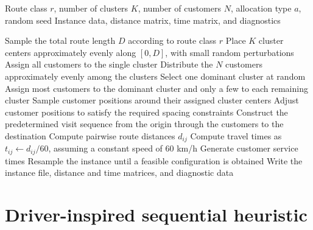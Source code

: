 \documentclass[3p,11pt,authoryear]{elsarticle}  %
\begin{document}
    
\begin{algorithm}[t]
\caption{Benchmark instance generation}
\label{alg:instance-generator}
\begin{algorithmic}[1]
\color{red}
\Require Route class $r$, number of clusters $K$, number of customers $N$,
         allocation type $a$, random seed
\Ensure Instance data, distance matrix, time matrix, and diagnostics

\State Sample the total route length $D$ according to route class $r$
\State Place $K$ cluster centers approximately evenly along $[0,D]$,
       with small random perturbations
    \State Assign all customers to the single cluster
    \State Distribute the $N$ customers approximately evenly among the clusters
\Else
    \State Select one dominant cluster at random
    \State Assign most customers to the dominant cluster and only a few to each remaining cluster
\EndIf
\State Sample customer positions around their assigned cluster centers
\State Adjust customer positions to satisfy the required spacing constraints
\State Construct the predetermined visit sequence from the origin through the customers to the destination
\State Compute pairwise route distances $d_{ij}$
\State Compute travel times as $t_{ij} \gets d_{ij}/60$, assuming a constant speed of $60$ km/h
\State Generate customer service times %
    \State Resample the instance until a feasible configuration is obtained
\EndIf
\State Write the instance file, distance and time matrices, and diagnostic data
\end{algorithmic}
\end{algorithm}




\newpage
\section{Driver-inspired sequential heuristic}
\end{document}
